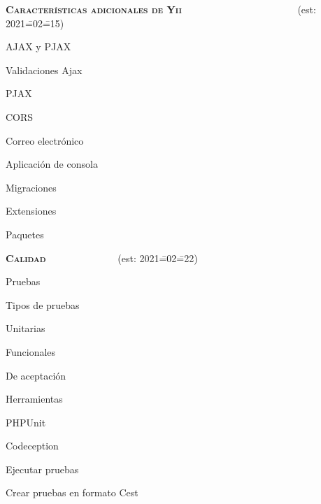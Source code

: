 \begin{longenum}
\begin{longenum}
    \end{longenum}
    \item \textbf{\textsc{Características adicionales de Yii}} \ \ \ \ \ \ \ \ \ \ \ \ \ \ \ \ \ \ \ \ \ \ \ (est: 2021\==02\==15)
    \begin{longenum}
        \item AJAX y PJAX
        \begin{longenum}
            \item Validaciones Ajax
            \item PJAX \opcional\
            \item CORS \opcional\
        \end{longenum}
        \item Correo electrónico
        \item Aplicación de consola
        \item Migraciones
        \item Extensiones
        \item Paquetes
    \end{longenum}
    \item \textbf{\textsc{Calidad}} \ \ \ \ \ \ \ \ \ \ \ \ \ \ (est: 2021\==02\==22)
    \begin{longenum}
        \item Pruebas
        \begin{longenum}
            \item Tipos de pruebas
            \begin{longenum}
                \item Unitarias
                \item Funcionales
                \item De aceptación
            \end{longenum}
            \item Herramientas
            \begin{longenum}
                \item PHPUnit \opcional\
                \item Codeception
                \begin{longenum}
                    \item Ejecutar pruebas
                    \item Crear pruebas en formato Cest

\end{longenum}
\end{longenum}
\end{longenum}
\end{longenum}
\end{longenum}

